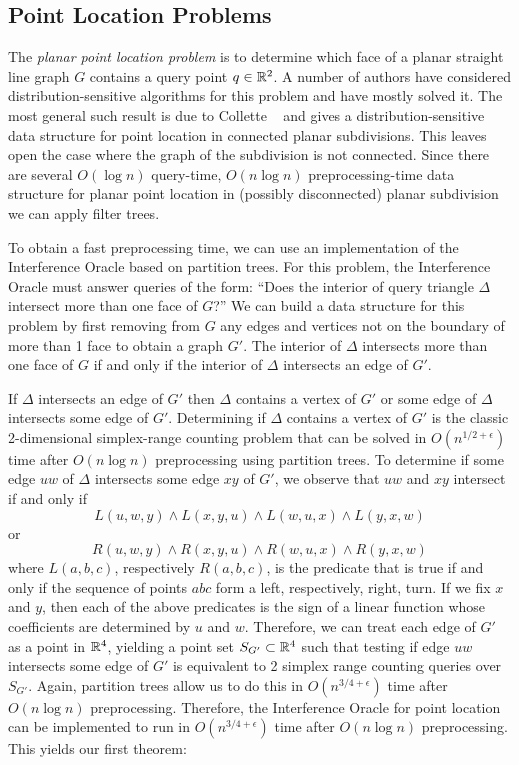 \documentclass{patmorin}
\begin{document}
\subsection{Point Location Problems}

The \emph{planar point location problem} is to determine which face
of a planar straight line graph $G$ contains a query point $q\in\mathbb{R}^2$.
A number of authors have considered distribution-sensitive algorithms for
this problem \cite{acmr00,amm00,amm01a,amm01b,ammw07,cdilm08,i01,i04} and
have mostly solved it.  The most general such result is due to Collette
\etal\ \cite{cdilm08} and gives a distribution-sensitive data structure
for point location in connected planar subdivisions.  This leaves open
the case where the graph of the subdivision is not connected.  Since there
are several $O(\log n)$ query-time, $O(n\log n)$ preprocessing-time data
structure for planar point location in (possibly disconnected) planar
subdivision \cite{k83,st86,egs86,m90,as98} we can apply filter trees.

To obtain a fast preprocessing time, we can use an
implementation of the Interference Oracle based on partition trees.  For
this problem, the Interference Oracle must answer queries of the form:
``Does the interior of query triangle $\Delta$ intersect more than one face
of $G$?''  We can build a data structure for this problem by first removing
from $G$ any edges and vertices not on the boundary of more than 1 face to
obtain a graph $G'$.  The interior of $\Delta$ intersects more than one
face of $G$ if and only if the interior of $\Delta$ intersects an edge of
$G'$.

If $\Delta$ intersects an edge of $G'$ then $\Delta$ contains a vertex of
$G'$ or some edge of $\Delta$ intersects some edge of $G'$.  Determining if
$\Delta$ contains a vertex of $G'$ is the classic 2-dimensional
simplex-range counting problem that can be solved in $O(n^{1/2+\epsilon})$
time after $O(n\log n)$ preprocessing using partition trees.  To determine
if some edge $uw$ of $\Delta$ intersects some edge $xy$ of $G'$, we observe
that $uw$ and $xy$ intersect if and only if
\[ L(u,w,y) \wedge L(x,y,u) \wedge L(w,u,x) \wedge L(y,x,w) \]
or
\[ R(u,w,y) \wedge R(x,y,u) \wedge R(w,u,x) \wedge R(y,x,w) \]
where $L(a,b,c)$, respectively $R(a,b,c)$, is the predicate that is true
if and only if the sequence of points $abc$ form a left, respectively,
right, turn.  If we fix $x$ and $y$, then each of the above predicates
is the sign of a linear function whose coefficients are determined by $u$
and $w$.  Therefore, we can treat each edge of $G'$ as a point in $\mathbb{R}^4$,
yielding a point set $S_{G'} \subset\mathbb{R}^4$ such that testing if edge $uw$
intersects some edge of $G'$ is equivalent to 2 simplex range counting
queries over $S_{G'}$.  Again, partition trees allow us to do this in
$O(n^{3/4+\epsilon})$ time after $O(n\log n)$ preprocessing.  Therefore,
the Interference Oracle for point location can be implemented to run
in $O(n^{3/4+\epsilon})$ time after $O(n\log n)$ preprocessing.  This yields
our first theorem:
\end{document}
